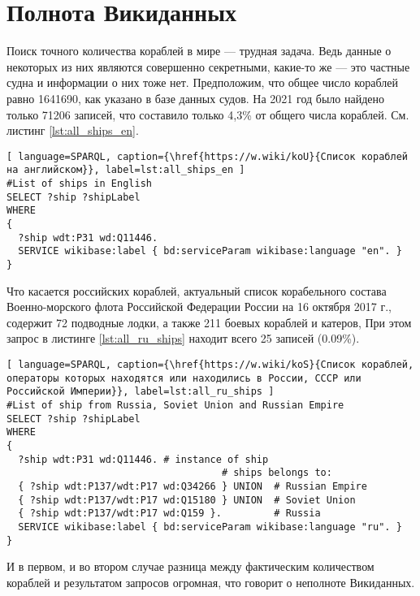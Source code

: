 \section{Полнота Викиданных}

Поиск точного количества кораблей в мире — трудная задача. Ведь данные о некоторых из них являются совершенно секретными, какие-то же — это частные судна и информации о них тоже нет. Предположим, что общее число кораблей равно \num{1641690}, как указано в базе данных судов\cite{FleetMon}. На 2021 год было найдено только \num{71206} записей, что составило только 4,3\% от общего числа кораблей. См. листинг \ref{lst:all_ships_en}.


\begin{lstlisting}[ language=SPARQL, caption={\href{https://w.wiki/koU}{Список кораблей на английском}}, label=lst:all_ships_en ]
#List of ships in English
SELECT ?ship ?shipLabel
WHERE
{
  ?ship wdt:P31 wd:Q11446.
  SERVICE wikibase:label { bd:serviceParam wikibase:language "en". }
}
\end{lstlisting}

Что касается российских кораблей, актуальный список корабельного состава Военно-морского флота Российской Федерации России на 16 октября 2017 г., содержит 72 подводные лодки, а также 211 боевых кораблей и катеров\cite{RussianShips}, При этом запрос в листинге \ref{lst:all_ru_ships} находит всего 25 записей (0.09\%).

\begin{lstlisting}[ language=SPARQL, caption={\href{https://w.wiki/koS}{Cписок кораблей, операторы которых находятся или находились в России, СССР или Российской Империи}}, label=lst:all_ru_ships ]
#List of ship from Russia, Soviet Union and Russian Empire
SELECT ?ship ?shipLabel
WHERE
{
  ?ship wdt:P31 wd:Q11446. # instance of ship
                                     # ships belongs to:
  { ?ship wdt:P137/wdt:P17 wd:Q34266 } UNION  # Russian Empire
  { ?ship wdt:P137/wdt:P17 wd:Q15180 } UNION  # Soviet Union
  { ?ship wdt:P137/wdt:P17 wd:Q159 }.         # Russia
  SERVICE wikibase:label { bd:serviceParam wikibase:language "ru". }
}
\end{lstlisting}

И в первом, и во втором случае разница между фактическим количеством кораблей и результатом запросов огромная, что говорит о неполноте Викиданных.


